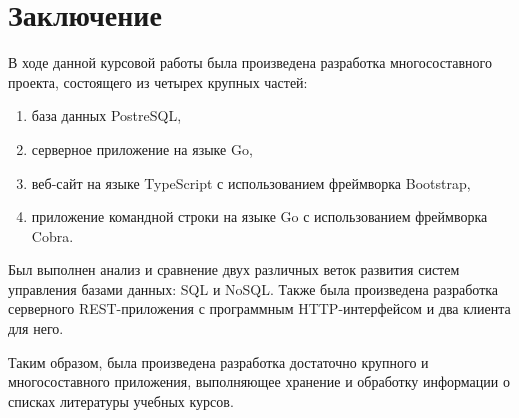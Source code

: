 \section*{Заключение}

В ходе данной курсовой работы была произведена разработка многосоставного проекта, состоящего из четырех крупных частей:

\begin{enumerate}
    \item база данных PostreSQL,
    \item серверное приложение на языке Go,
    \item веб-сайт на языке TypeScript с использованием фреймворка Bootstrap,
    \item приложение командной строки на языке Go с использованием фреймворка Cobra.
\end{enumerate}

Был выполнен анализ и сравнение двух различных веток развития систем управления базами данных: SQL и NoSQL.
Также была произведена разработка серверного REST-приложения с программным HTTP-интерфейсом и два клиента
для него.

Таким образом, была произведена разработка достаточно крупного и многосоставного приложения, выполняющее хранение
и обработку информации о списках литературы учебных курсов.